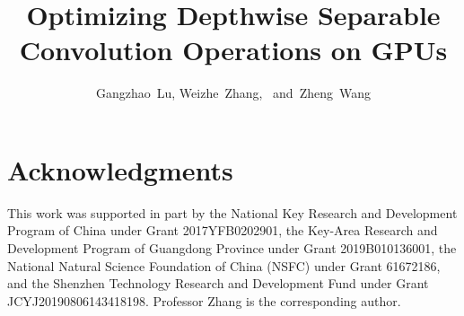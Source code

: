 \documentclass[journal,compsoc,10pt,final]{IEEEtran}
\begin{document}
\title{Optimizing Depthwise Separable Convolution Operations on GPUs}

\author{Gangzhao~Lu, Weizhe~Zhang,~ and~Zheng~Wang
}

\IEEEtitleabstractindextext{

}
\maketitle









\section*{Acknowledgments}
This work was supported in part by the National Key Research and Development Program of China under Grant 2017YFB0202901, the Key-Area Research and Development Program of Guangdong Province under Grant 2019B010136001, the National Natural Science Foundation of China (NSFC) under Grant 61672186, and the Shenzhen Technology Research and Development Fund under Grant JCYJ20190806143418198. Professor Zhang is the corresponding author.
\end{document}
